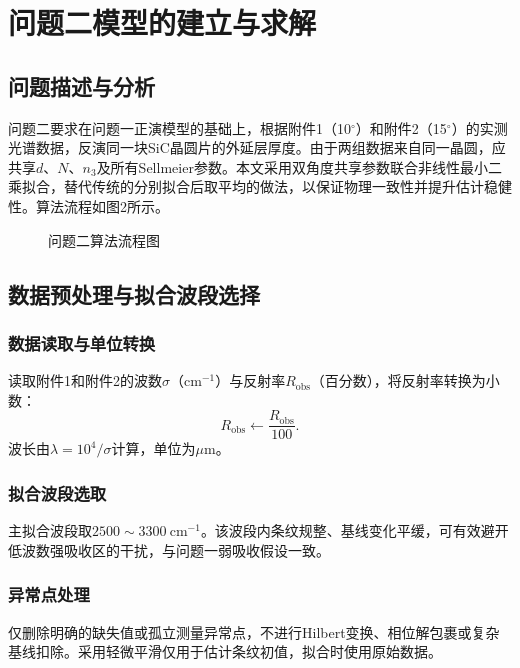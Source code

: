 \documentclass[12pt,a4paper]{ctexart}
\begin{document}
	\section{问题二模型的建立与求解}
	
	\subsection{问题描述与分析}
	问题二要求在问题一正演模型的基础上，根据附件1（10$^\circ$）和附件2（15$^\circ$）的实测光谱数据，反演同一块SiC晶圆片的外延层厚度。由于两组数据来自同一晶圆，应共享$d$、$N$、$n_3$及所有Sellmeier参数。本文采用双角度共享参数联合非线性最小二乘拟合，替代传统的分别拟合后取平均的做法，以保证物理一致性并提升估计稳健性。算法流程如图2所示。
	
	\begin{figure}[htbp]
		\centering
		\caption{问题二算法流程图}
		\label{fig:q2_flow}
	\end{figure}
	
	\subsection{数据预处理与拟合波段选择}
	
	\subsubsection{数据读取与单位转换}
	读取附件1和附件2的波数$\sigma$（$\mathrm{cm^{-1}}$）与反射率$R_{\mathrm{obs}}$（百分数），将反射率转换为小数：
	\begin{equation}
		R_{\mathrm{obs}} \leftarrow \frac{R_{\mathrm{obs}}}{100}.
	\end{equation}
	波长由$\lambda = 10^4/\sigma$计算，单位为$\mu\mathrm{m}$。
	
	\subsubsection{拟合波段选取}
	主拟合波段取$2500\sim3300\ \mathrm{cm^{-1}}$。该波段内条纹规整、基线变化平缓，可有效避开低波数强吸收区的干扰，与问题一弱吸收假设一致。
	
	\subsubsection{异常点处理}
	仅删除明确的缺失值或孤立测量异常点，不进行Hilbert变换、相位解包裹或复杂基线扣除。采用轻微平滑仅用于估计条纹初值，拟合时使用原始数据。
	
\end{document}
